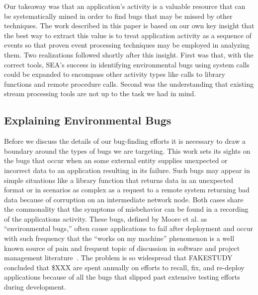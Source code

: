 Our takeaway
was that an application's activity
is a valuable resource that can be systematically mined
in order to find bugs
that may be missed by other techniques.
The work described in this paper
is based on our own key insight that the best way to extract this
value
is to treat application activity
as a sequence of events
so that proven event processing techniques
may be employed in analyzing them.
Two realizations followed shortly after this
insight.
First was that, with the correct tools,
SEA's success in identifying environmental bugs using system calls
could be expanded
to encompass other activity types
like calls to library functions
and remote procedure calls.
Second was the understanding that existing
stream processing tools
are not up to the
task we had in mind.



\subsection{Explaining Environmental Bugs}

Before we discuss the details of our bug-finding efforts it is necessary to
draw a boundary around the types of bugs we are targeting.
This work sets its sights on the bugs that occur when an some external
entity supplies unexpected or incorrect data to an
application resulting in its failure.
Such bugs may appear in simple situations like a library function that
returns data in an unexpected format or in scenarios as complex
as a request to a remote
system returning bad data because of corruption on an intermediate network
node.
Both cases share the commonality that the symptoms of misbehavior
can be found in a recording of the applications activity.
These bugs, defined by Moore et al. as ``environmental bugs,''
often cause applications to fail after deployment
and occur with such frequency
that the ``works on my machine'' phenomenon is a well known
source of pain
and frequent topic of discussion
in software and project management
literature~\cite{notreal}.
The problem is so widespread
that FAKESTUDY concluded
that \$XXX are spent annually on efforts to
recall,
fix,
and re-deploy applications
because of all the bugs
that slipped past extensive testing efforts
during development.

